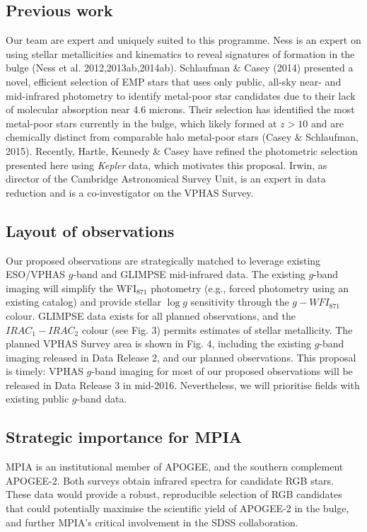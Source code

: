 \documentclass[a4paper]{article}
\begin{document}
\begin{ObservingProgram}
\subsection*{Previous work}
Our team are expert and uniquely suited to this programme.  Ness is an expert on using stellar metallicities and kinematics to reveal signatures of formation in the bulge (Ness et al. 2012,2013ab,2014ab).  Schlaufman \& Casey (2014) presented a novel, efficient selection of EMP stars that uses only public, all-sky near- and mid-infrared photometry to identify metal-poor star candidates due to their lack of molecular absorption near 4.6 microns. Their selection has identified the most metal-poor stars currently in the bulge, which likely formed at $z > 10$ and are chemically distinct from comparable halo metal-poor stars (Casey \& Schlaufman, 2015). Recently, Hartle, Kennedy \& Casey have refined the photometric selection presented here using \textit{Kepler} data, which motivates this proposal. Irwin, as director of the Cambridge Astronomical Survey Unit, is an expert in data reduction and is a co-investigator on the VPHAS Survey.


\subsection*{Layout of observations}
Our proposed observations are strategically matched to leverage existing ESO/VPHAS $g$-band and GLIMPSE mid-infrared data. The existing $g$-band imaging will simplify the WFI$_{871}$ photometry (e.g., forced photometry using an existing catalog) and provide stellar $\log{g}$ sensitivity through the $g-WFI_{871}$ colour. GLIMPSE data exists for all planned observations, and the $IRAC_{1} - IRAC_{2}$ colour (see Fig. 3) permits estimates of stellar metallicity.  The planned VPHAS Survey area is shown in Fig. 4, including the existing $g$-band imaging released in Data Release 2, and our planned observations. This proposal is timely: VPHAS $g$-band imaging for most of our proposed observations will be released in Data Release 3 in mid-2016. Nevertheless, we will prioritise fields with existing public $g$-band data.


\subsection*{Strategic importance for MPIA}
MPIA is an institutional member of APOGEE, and the southern complement APOGEE-2. Both surveys obtain infrared spectra for candidate RGB stars. These data would provide a robust, reproducible selection of RGB candidates that could potentially maximise the scientific yield of APOGEE-2 in the bulge, and further MPIA's critical involvement in the SDSS collaboration. 


\end{ObservingProgram}
\end{document}
